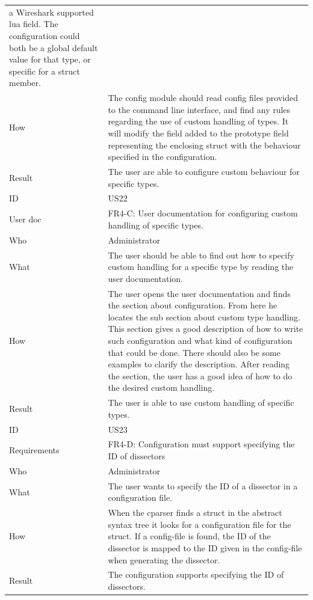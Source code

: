 \begin{table}[htbp]
{\begin{tabularx}{1.2\textwidth}{l X}
 	a Wireshark supported lua field. The configuration could both be a global default value for that type, or specific for a struct member. \\
	How & The config module should read config files provided to the command line interface, and find any rules regarding the use of custom handling of types.
 	It will modify the field added to the prototype field representing the enclosing struct with the behaviour specified in the configuration. \\
	Result & The user are able to configure custom behaviour for specific types. \\
	\midrule
	ID & US22 \\
	User doc & FR4-C: User documentation for configuring custom handling of specific types. \\
	Who & Administrator \\
	What & The user should be able to find out how to specify custom handling for a specific type by reading the user documentation.\\
	How & The user opens the user documentation and finds the section about configuration. From here he locates the sub section about custom type handling. 
	This section gives a good description of how to write such configuration and what kind of configuration that could be done. There should also be some
 	examples to clarify the description. After reading the section, the user has a good idea of how to do the desired custom handling. \\
	Result & The user is able to use custom handling of specific types. \\
	\midrule
	ID & US23 \\
	Requirements &  FR4-D: Configuration must support specifying the ID of dissectors \\
	Who & Administrator \\
	What & The user wants to specify the ID of a dissector in a configuration file. \\
	How & When the cparser finds a struct in the abstract syntax tree it looks for a configuration file for the struct. If a config-file is found, the ID of the dissector
	is mapped to the ID given in the config-file when generating the dissector. \\	
	Result & The configuration supports specifying the ID of dissectors. \\
	\midrule
	
\end{tabularx}}
\end{table}

